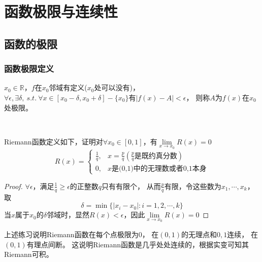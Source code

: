 
\chapter{函数极限与连续性}

\section{函数的极限}

\subsection{函数极限定义}

\begin{definition}[函数极限]
  $x_0 \in \mathbb{R}$，$f$在$x_0$邻域有定义($x_0$处可以没有)，$\forall \epsilon, \exists \delta, ~s.t.~ \forall x \in [x_0 - \delta, x_0 + \delta] - \{x_0\}$有$|f(x) - A| < \epsilon$，
  则称$A$为$f(x)$在$x_0$处极限。
\end{definition}

~

\begin{exercise}[Riemann函数]
  Riemann函数定义如下，证明对$\forall x_0 \in [0,1]$，有$\lim \limits _{x \rightarrow x_0}R(x) = 0$
  \begin{equation*}
    R(x) =
    \begin{cases}
      \frac{1}{q}, & x = \frac{p}{q}(\frac{p}{q}\text{是既约真分数})\\
      0, & x\text{是(0,1)中的无理数或者0,1本身}
    \end{cases}
  \end{equation*}
\end{exercise}

\begin{proof}
  $\forall \epsilon$，满足$\frac{1}{q} \geq \epsilon$的正整数$q$只有有限个，
  从而$\frac{p}{q}$有限，令这些数为$x_1,\cdots,x_k$，
  取
  \begin{equation*}
    \delta = \min\{|x_i - x_0|: i = 1,2,\cdots,k\}
  \end{equation*}
  当$x$属于$x_0$的$\delta$邻域时，显然$R(x) < \epsilon$，因此$\lim \limits _{x \rightarrow x_0}R(x) = 0$
\end{proof}

\begin{note}
  上述练习说明Riemann函数在每个点极限为$0$，
  在$(0,1)$的无理点和$0,1$连续，
  在$(0,1)$有理点间断。
  这说明Riemann函数是几乎处处连续的，根据实变可知其Riemann可积。
\end{note}


